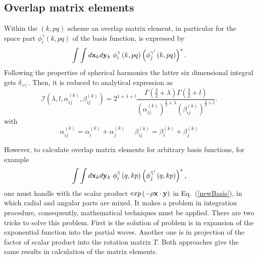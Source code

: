 \documentclass[12pt,a4paper,twoside]{article}
\begin{document}
\subsection{Overlap matrix elements}
Within the $\left(k, pq \right)$ scheme an overlap matrix element, in particular for the space part $ \phi_{i}^{\gamma}\left(k, pq \right)$ of the basis function, is expressed by
\begin{equation}
 \int \int d{\bf x}_k d{\bf y}_k ~\phi_{i}^{\gamma}\left(k, pq \right) \left( \phi_{j}^{\gamma^{\prime}}\left(k, pq \right) \right)^{*}.
\end{equation}
Following the properties of spherical harmonics the latter six dimensional integral gets $\delta_{\gamma \gamma^{\prime}}$. Then, it  is reduced to analytical expression as  
\begin{equation}
\mathcal{I} \left( \lambda,l,\alpha_{ij}^{(k)},\beta_{ij}^{(k)} \right)= 2^{1+\lambda+l}\frac{\Gamma \left( \frac{3}{2}+\lambda \right) \Gamma \left( \frac{3}{2}+l \right) }{ \left( \alpha_{ij}^{(k)} \right) ^{\frac{3}{2}+\lambda} \left( \beta_{ij}^{(k)} \right) ^{\frac{3}{2}+l}} .
\end{equation}
with 
\begin{equation}
\alpha_{ij}^{(k)}=\alpha_{i}^{(k)}+\alpha_{j}^{(k)}~~~~~~
\beta_{ij}^{(k)}=\beta_{i}^{(k)}+\beta_{j}^{(k)}
\end{equation}


However, to calculate overlap matrix elements for arbitrary basis functions, for example
\begin{equation}
\int \int d{\bf x}_k d{\bf y}_k ~\phi_{i}^{\tilde{\gamma}}\left(q,kp \right) \left( \phi_{j}^{\tilde{\gamma}^{\prime}}\left(q,kp \right) \right)^{*},
\label{me_arb}
\end{equation}
one must handle with the scalar product $exp\left(- \rho {\bf x} \cdot {\bf y} \right)$ in  Eq.~(\ref{newBasis}), in which radial and angular parts are mixed. It makes a problem in integration procedure, consequently, mathematical techniques must be applied. There are two tricks to solve this problem.  First is the solution of problem is in expansion of  the exponential function into the partial waves. Another one is in projection of the factor of scalar product into the rotation matrix $T$. Both approaches give the same results in calculation of the matrix elements. 
\end{document}
